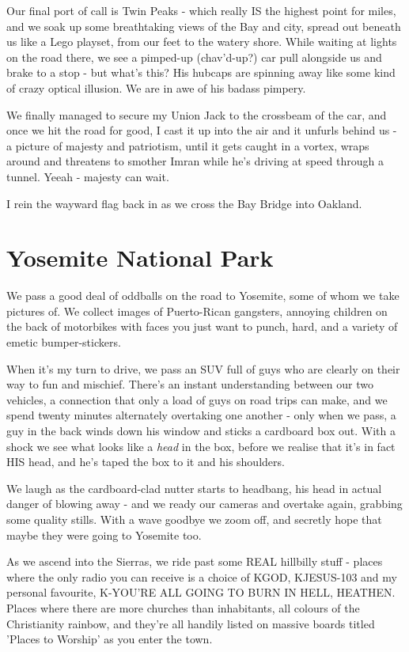 \documentclass[a5paper,10pt,titlepage,draft]{book}
\begin{document}
Our final port of call is Twin Peaks - which really IS the highest point for miles, and we soak up some breathtaking views of the Bay and city, spread out beneath us like a Lego playset, from our feet to the watery shore.  While waiting at lights on the road there, we see a pimped-up (chav'd-up?) car pull alongside us and brake to a stop - but what's this?  His hubcaps are spinning away like some kind of crazy optical illusion.  We are in awe of his badass pimpery.

We finally managed to secure my Union Jack to the crossbeam of the car, and once we hit the road for good, I cast it up into the air and it unfurls behind us - a picture of majesty and patriotism, until it gets caught in a vortex, wraps around and threatens to smother Imran while he's driving at speed through a tunnel.  Yeeah - majesty can wait.

I rein the wayward flag back in as we cross the Bay Bridge into Oakland.

\section*{Yosemite National Park}
We pass a good deal of oddballs on the road to Yosemite, some of whom we take pictures of.  We collect images of Puerto-Rican gangsters, annoying children on the back of motorbikes with faces you just want to punch, hard, and a variety of emetic bumper-stickers.

When it's my turn to drive, we pass an SUV full of guys who are clearly on their way to fun and mischief.  There's an instant understanding between our two vehicles, a connection that only a load of guys on road trips can make, and we spend twenty minutes alternately overtaking one another - only when we pass, a guy in the back winds down his window and sticks a cardboard box out.  With a shock we see what looks like a \emph{head} in the box, before we realise that it's in fact HIS head, and he's taped the box to it and his shoulders.

We laugh as the cardboard-clad nutter starts to headbang, his head in actual danger of blowing away - and we ready our cameras and overtake again, grabbing some quality stills.  With a wave goodbye we zoom off, and secretly hope that maybe they were going to Yosemite too.

As we ascend into the Sierras, we ride past some REAL hillbilly stuff - places where the only radio you can receive is a choice of KGOD, KJESUS-103 and my personal favourite, K-YOU'RE ALL GOING TO BURN IN HELL, HEATHEN.  Places where there are more churches than inhabitants, all colours of the Christianity rainbow, and they're all handily listed on massive boards titled 'Places to Worship' as you enter the town.
\end{document}
